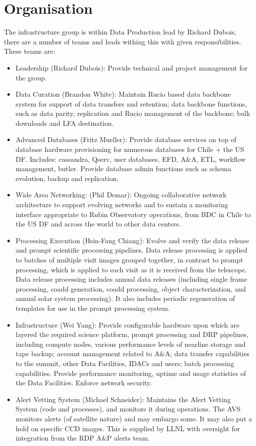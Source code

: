 \section{Organisation} \label{sec:org}

The infrastructure group is within Data Production lead by Richard Dubois, there are a number of teams and leads withing this
with given responsibilities. These teams are:
\begin{itemize}
\item Leadership (Richard Dubois): Provide technical and project management for the group.
\item {Data Curation (Brandon White): Maintain \gls{Rucio} based data backbone system for support of data transfers and retention; data backbone functions, such as data parity, replication and \gls{Rucio} management of the backbone; bulk downloads and LFA destination.}
\item {Advanced Databases (Fritz Mueller): Provide database services on top of database hardware provisioning for numerous databases for Chile + the US \gls{DF}. Includes: cassandra, Qserv, user databases, EFD, A\&A, ETL, workflow management, butler. Provide database admin functions such as schema evolution, backup and replication.}
\item {Wide Area Networking: (Phil Demar): Ongoing collaborative network
    architecture to support evolving networks and to sustain a
    \gls{monitoring} interface appropriate to Rubin Observatory operations,
    from BDC in Chile to the US \gls{DF} and across the world to other data
    centers.}
  \item {Processing Execution (Hsin-Fang Chiang): Evolve and verify the data release and prompt scientific processing pipelines. Data release processing is applied to batches of multiple visit images grouped together, in contrast to prompt processing, which is applied to each visit as it is received from the telescope. Data release processing includes annual data releases (including single frame processing, coadd generation, coadd processing, object characterization, and annual solar system processing). It also includes periodic regeneration of templates for use in the prompt processing system.}
\item {Infrastructure (Wei Yang): Provide configurable hardware upon which are layered the required science platform, prompt processing and \gls{DRP} pipelines, including compute nodes, various performance levels of nearline storage and tape backup; account management related to A\&A; data transfer capabilities to the summit, other Data Facilities, IDACs and users; batch processing capabilities. Provide performance monitoring, uptime and usage statistics of the Data Facilities. Enforce network security.}
\item {Alert Vetting System (Michael Schneider): Maintains the \gls{Alert}
    Vetting System (code and processes), and monitors it during
    operations. The \gls{AVS} monitors alerts (of satellite nature) and may
    embargo some. It may also put a hold on specific \gls{CCD} images. This
    is supplied by LLNL with oversight for integration from the \gls{RDP} A\&P alerts team.}
\end{itemize}



